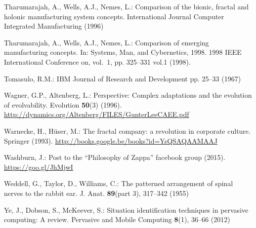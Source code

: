 \documentclass[twocolumn]{svjour3}
\begin{document}
\begin{thebibliography}{10}
Tharumarajah, A., Wells, A.J., Nemes, L.: Comparison of the bionic, fractal and
  holonic manufacturing system concepts.
\newblock International Journal Computer Integrated Manufacturing  (1996)

Tharumarajah, A., Wells, A.J., Nemes, L.: Comparison of emerging manufacturing
  concepts.
\newblock In: Systems, Man, and Cybernetics, 1998. 1998 IEEE International
  Conference on, vol.~1, pp. 325--331 vol.1 (1998).
\newblock {}

Tomasulo, R.M.: IBM Journal of Research and Development pp. 25--33 (1967)

Wagner, G.P., Altenberg, L.: Perspective: Complex adaptations and the evolution
  of evolvability.
\newblock Evolution \textbf{50}(3) (1996).
\newblock \urlprefix\url{http://dynamics.org/Altenberg/FILES/GunterLeeCAEE.pdf}

Warnecke, H., H{\"u}ser, M.: The fractal company: a revolution in corporate
  culture.
\newblock Springer (1993).
\newblock \urlprefix\url{http://books.google.be/books?id=YsQSAQAAMAAJ}

Washburn, J.: Post to the {``}{Philosophy of Zappa}{''} facebook group (2015).
\newblock \urlprefix\url{https://goo.gl/JhMjwI}

Weddell, G., Taylor, D., Williams, C.: The patterned arrangement of spinal
  nerves to the rabbit ear.
\newblock J. Anat. \textbf{89}(part 3), 317--342 (1955)

Ye, J., Dobson, S., McKeever, S.: Situation identification techniques in
  pervasive computing: A review.
\newblock Pervasive and Mobile Computing \textbf{8}(1), 36--66 (2012)

\end{thebibliography}
\end{document}
